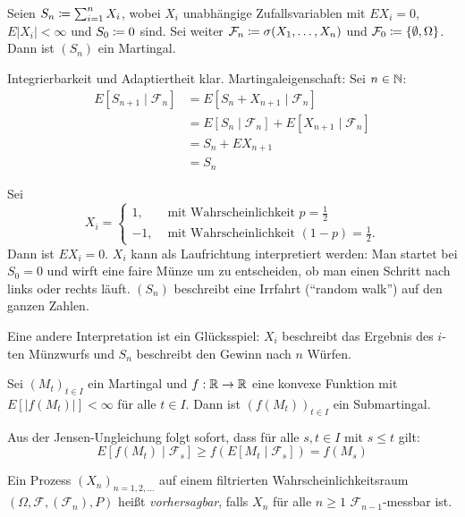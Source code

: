\documentclass[a4paper,twoside,DIV15,BCOR12mm]{scrbook}
\newcommand{\cF}{\mathcal F}
\begin{document}
\begin{beispiel}
Seien $S_n \da \sum_{i=1}^n X_i$, wobei $X_i$ unabhängige Zufallsvariablen mit $EX_i=0$, $E|X_i|<\infty$ und $S_0\da 0$ sind. Sei weiter $\cF_n\da \sigma(X_1,\ldots,X_n)$ und $\cF_0 \da \{\emptyset, \Omega\}$. Dann ist $(S_n)$ ein Martingal.
\end{beispiel}
\begin{beweis}
Integrierbarkeit und Adaptiertheit klar. Martingaleigenschaft: Sei $n\in\mathbb{N}$:
\begin{align*}
E[S_{n+1}\mid \cF_n] &= E[S_n + X_{n+1}\mid \cF_n] \\
&= E[S_n\mid \cF_n] + E[X_{n+1}\mid \cF_n] \\
&= S_n + EX_{n+1} \\
&= S_n
\end{align*}
\end{beweis}

Sei 
\[
X_i = 
\begin{cases}
1, & \text{ mit Wahrscheinlichkeit $p=\frac 12$} \\
-1,& \text{ mit Wahrscheinlichkeit $(1-p)=\frac 12$.}
\end{cases}
\]
Dann ist $EX_i = 0$. $X_i$ kann als Laufrichtung interpretiert werden: Man startet bei $S_0=0$ und wirft eine faire Münze um zu entscheiden, ob man einen Schritt nach links oder rechts läuft. $(S_n)$ beschreibt eine Irrfahrt (“random walk”) auf den ganzen Zahlen.

Eine andere Interpretation ist ein Glücksspiel: $X_i$ beschreibt das Ergebnis des $i$-ten Münzwurfs und $S_n$ beschreibt den Gewinn nach $n$ Würfen.

\begin{satz}
Sei $(M_t)_{t\in I}$ ein Martingal und $f:\mathbb{R} \to\mathbb{R}$ eine konvexe Funktion mit $E[|f(M_t)|]<\infty$ für alle $t\in I$. Dann ist $(f(M_t))_{t\in I}$ ein Submartingal.
\end{satz}

\begin{beweis}
Aus der Jensen-Ungleichung folgt sofort, dass für alle $s,t\in I$ mit $s\le t$ gilt:
\[
E[f(M_t)\mid \cF_s] \ge f(E[M_t\mid \cF_s]) = f(M_s)
\]
\end{beweis}

\begin{definition}
Ein Prozess $(X_n)_{n=1,2,\ldots}$ auf einem filtrierten Wahrscheinlichkeitsraum $(\Omega, \cF, (\cF_n), P)$ heißt \emph{vorhersagbar},  falls $X_n$ für alle $n\ge 1$ $\cF_{n-1}$-messbar ist.
\end{definition}
\end{document}
